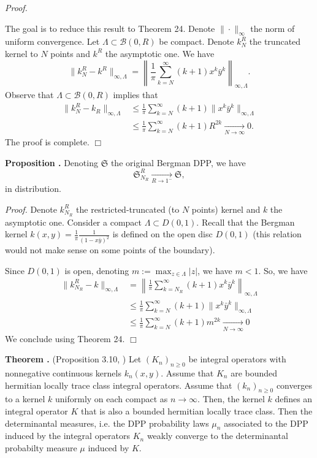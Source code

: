 \documentclass[11pt]{article}
\newcommand{\qed}{\hfill$\Box$}
\newcounter{cnt}
\newcommand{\cnt}{\thecnt \stepcounter{cnt}}
\begin{document}
\textit{Proof.}

The goal is to reduce this result to Theorem 24. Denote $\|\cdot\|_\infty$ the norm of uniform convergence. Let $\Lambda \subset \mathcal{B}(0,R)$ be compact. Denote $k_N^R$ the truncated kernel to $N$ points and $k^R$ the asymptotic one. We have
\[
\|k_N^R - k^R\|_{\infty, \Lambda} = \left\| \frac{1}{\pi} \sum_{k=N}^\infty (k+1) x^k \bar{y}^k \right\|_{\infty, \Lambda}.
\]
Observe that $\Lambda \subset \mathcal{B}(0,R)$ implies that
\begin{align*}
\|k_{N}^R - k_R\|_{\infty, \Lambda} &\leqslant \frac{1}{\pi} \sum_{k=N}^\infty (k+1) \|x^k \bar{y}^k\|_{\infty, \Lambda} \\
&\leqslant \frac{1}{\pi} \sum_{k=N}^\infty (k+1) R^{2k} \xrightarrow[N \to \infty]{} 0.
\end{align*}
The proof is complete. \qed

\textbf{Proposition \cnt.} Denoting $\mathfrak{S}$ the original Bergman DPP, we have
\[
\mathfrak{S}_{N_R}^R \xrightarrow[R \to 1^-]{} \mathfrak{S},
\]
in distribution.

\textit{Proof.}
Denote $k_{N_R}^R$ the restricted-truncated (to $N$ points) kernel and $k$ the asymptotic one. Consider a compact $\Lambda \subset D(0,1)$. Recall that the Bergman kernel $k(x,y) = \frac{1}{\pi}\frac{1}{(1-x\bar{y})^2}$ is defined on the open disc $D(0,1)$ (this relation would not make sense on some points of the boundary).

Since $D(0,1)$ is open, denoting $m := \max_{z \in \Lambda} |z|$, we have $m < 1$. So, we have
\begin{align*}
\|k_{N_R}^R - k\|_{\infty, \Lambda} &= \left\| \frac{1}{\pi} \sum_{k=N_R}^\infty (k+1) x^k \bar{y}^k \right\|_{\infty, \Lambda} \\
&\leqslant \frac{1}{\pi} \sum_{k=N}^\infty (k+1) \|x^k \bar{y}^k\|_{\infty, \Lambda} \\
&\leqslant \frac{1}{\pi} \sum_{k=N}^\infty (k+1) m^{2k} \xrightarrow[N \to \infty]{} 0
\end{align*}
We conclude using Theorem 24. \qed

\textbf{Theorem \cnt.} (Proposition 3.10, \cite{ShiraiTakahashi2003})
Let $(K_n)_{n \ge 0}$ be integral operators with nonnegative continuous kernels $k_n(x,y)$. Assume that $K_n$ are bounded hermitian locally trace class integral operators. Assume that $(k_n)_{n \ge 0}$ converges to a kernel $k$ uniformly on each compact as $n \to \infty$. Then, the kernel $k$ defines an integral operator $K$ that is also a bounded hermitian locally trace class. Then the determinantal measures, i.e. the DPP probability laws $\mu_n$ associated to the DPP induced by the integral operators $K_n$ weakly converge to the determinantal probabilty measure $\mu$ induced by $K$.
\end{document}
